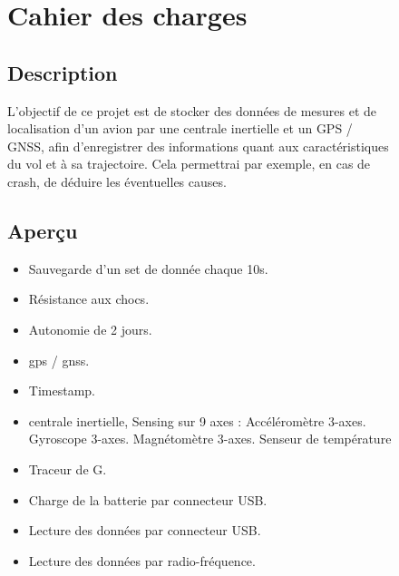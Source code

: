 \begin{figure}
	
	\hfill
	
	
	\begin{minipage}{1\textwidth}
		\section{Cahier des charges}
		
		\subsection{Description}
		L'objectif de ce projet est de stocker des données de mesures et de localisation d'un avion par une centrale inertielle et un GPS / GNSS, afin d'enregistrer des informations quant aux caractéristiques du vol et à sa trajectoire. Cela permettrai par exemple, en cas de crash, de déduire les éventuelles causes. 
	\end{minipage} \vspace{+4mm}
	
	\begin{minipage}{1\textwidth}
		
		\subsection{Aperçu}
		\begin{itemize}
			\item	Sauvegarde d’un set de donnée chaque 10s.
			\item	Résistance aux chocs.
			\item	Autonomie de 2 jours.
			\item	\gls{gps} / \gls{gnss}.
			\item	Timestamp.
			\item	\gls{centrale inertielle}, Sensing sur 9 axes :
			\subitem Accéléromètre 3-axes. 
			\subitem	Gyroscope 3-axes.
			\subitem	Magnétomètre 3-axes. 
			\subitem	Senseur de température
			\item Traceur de G.
			\item Charge de la batterie par connecteur USB.
			\item Lecture des données par connecteur USB.
			\item Lecture des données par radio-fréquence.
		\end{itemize}
		
		
	\end{minipage}
	
\end{figure}


